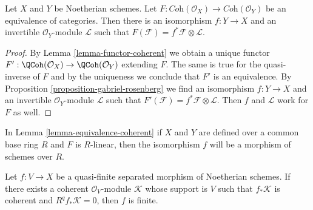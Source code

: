 \begin{lemma}
\label{lemma-equivalence-coherent}
Let $X$ and $Y$ be Noetherian schemes. Let
$F : \textit{Coh}(\mathcal{O}_X) \to \textit{Coh}(\mathcal{O}_Y)$
be an equivalence of categories. Then there is an isomorphism $f : Y \to X$
and an invertible $\mathcal{O}_Y$-module $\mathcal{L}$
such that $F(\mathcal{F}) = f^*\mathcal{F} \otimes \mathcal{L}$.
\end{lemma}

\begin{proof}
By Lemma \ref{lemma-functor-coherent} we obtain a unique functor
$F' : \QCoh(\mathcal{O}_X) \to \QCoh(\mathcal{O}_Y)$ extending $F$.
The same is true for the quasi-inverse of $F$ and by the uniqueness
we conclude that $F'$ is an equivalence. By
Proposition \ref{proposition-gabriel-rosenberg}
we find an isomorphism $f : Y \to X$
and an invertible $\mathcal{O}_Y$-module $\mathcal{L}$
such that $F'(\mathcal{F}) = f^*\mathcal{F} \otimes \mathcal{L}$.
Then $f$ and $\mathcal{L}$ work for $F$ as well.
\end{proof}

\begin{remark}
\label{remark-equivalence-coherent-linear}
In Lemma \ref{lemma-equivalence-coherent} if $X$ and $Y$ are defined
over a common base ring $R$ and $F$ is $R$-linear, then the isomorphism
$f$ will be a morphism of schemes over $R$.
\end{remark}

\begin{lemma}
\label{lemma-characterize-finite}
Let $f : V \to X$ be a quasi-finite separated morphism of Noetherian
schemes. If there exists a coherent $\mathcal{O}_V$-module $\mathcal{K}$
whose support is $V$ such that $f_*\mathcal{K}$ is coherent and
$R^qf_*\mathcal{K} = 0$, then $f$ is finite.
\end{lemma}

